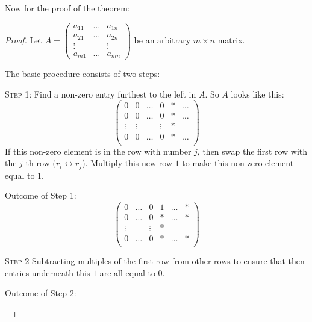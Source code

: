 \documentclass[10pt]{scrartcl}
\begin{document}
Now for the proof of the theorem: 

\begin{proof}
Let
$A = \begin{pmatrix}	
a_{11} &\dots & a_{1n}\\
a_{21} &\dots & a_{2n}\\
\vdots & & \vdots\\
a_{m1} & \dots & a_{mn}
\end{pmatrix}
$ be an arbitrary $m\times n$ matrix. 

The basic procedure consists of two steps: 

\textsc{Step 1:} Find a non-zero entry furthest to the left in $A$. So $A$ looks like this: 
\[
  \begin{pmatrix}
  0 & 0 &\dots & 0 & * &\dots \\
  0 & 0 &\dots & 0 & * &\dots \\
  \vdots & \vdots &&\vdots & * & \\
    0 & 0 &\dots & 0 & * &\dots \\
  \end{pmatrix}
\]
If this non-zero element is in the row with number $j$, then swap the first row with the $j$-th row $(r_i \leftrightarrow r_j$). Multiply this new row $1$ to make this non-zero element equal to $1$. 

Outcome of Step 1: 
\[
  \begin{pmatrix}
    0 &\dots & 0 & 1 &\dots &* \\
    0 &\dots & 0 & * &\dots &*\\
  \vdots &&\vdots & * && \\
     0 &\dots & 0 & * &\dots &*\\
  \end{pmatrix}
\]

\textsc{Step 2} Subtracting multiples of the first row from other rows to ensure that then entries underneath this $1$ are all equal to $0$. 

Outcome of Step 2:  

 \begin{center}
    \end{center}


\end{proof}
\end{document}
